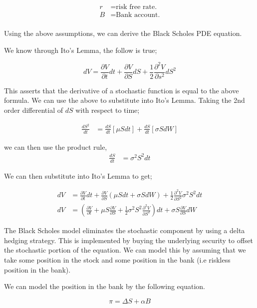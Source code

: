 \documentclass[12pt]{article}
\begin{document}
\begin{align*}
r &= \text{risk free rate.} \\
B &= \text{Bank account.} \\
\end{align*}

Using the above assumptions, we can derive the Black Scholes PDE equation.

We know through Ito's Lemma, the follow is true;

\begin{equation}
dV = \frac{\partial V}{\partial t}dt + \frac{\partial V}{\partial S}dS + \frac{1}{2}\frac{\partial^2 V}{\partial s^2}dS^2
\end{equation}

This asserts that the derivative of a stochastic function is equal to the above formula. We can use the above to substitute into Ito's Lemma. Taking the 2nd order differential of $dS$ with respect to time;

\begin{align*}
\frac{dS^2}{dt} &= \frac{dS}{dt}[\mu Sdt] + \frac{dS}{dt}[\sigma SdW]
\end{align*}

we can then use the product rule,
\begin{align*}
\frac{dS}{dt} &= \sigma ^2 S^2 dt 
\end{align*}

We can then substitute into Ito's Lemma to get;

\begin{align*}
dV &= \frac{\partial V}{\partial t}dt+\frac{\partial V}{\partial S}(\mu Sdt + \sigma SdW) + \frac{1}{2}\frac{\partial ^2V}{\partial S^2}\sigma^2 S^2 dt \\
dV &= \left(\frac{\partial V}{\partial t} + \mu S \frac{\partial V}{\partial S} + \frac{1}{2}\sigma ^2 S^2 \frac{\partial ^2V}{\partial S^2}\right)dt + \sigma S \frac {\partial V}{\partial S}dW
\end{align*}

The Black Scholes model eliminates the stochastic component by using a delta hedging strategy. This is implemented by buying the underlying security to offset the stochastic portion of the equation.
We can model this by assuming that we take some position in the stock and some position in the bank (i.e riskless position in the bank).

We can model the position in the bank by the following equation.

\begin{equation}
\pi = \Delta S + \alpha B
\end{equation}
\end{document}
